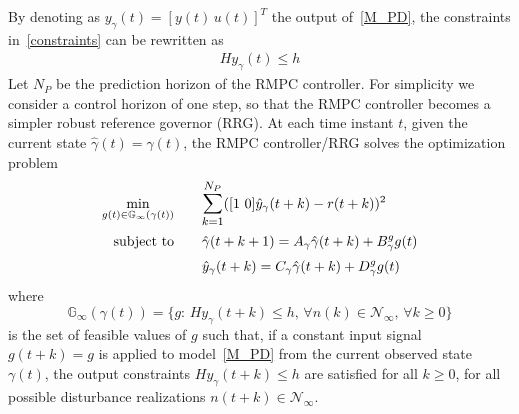 \documentclass[letterpaper, 10 pt, conference]{ieeeconf}  %
\newcommand{\AB}[1]{\textbf{\color{magenta}{[AB: #1]}}}
\newcommand{\SK}[1]{\textbf{\color{blue}{[SK: #1]}}}
\begin{document}
By denoting as $y_{\gamma}(t)=[y(t) \hspace{2pt} u(t)]^T$ the output of~\eqref{M_PD}, the constraints in~\eqref{constraints} can be rewritten as
	\begin{equation*}
	\begin{matrix}
	Hy_{\gamma}(t) \leq h
	\end{matrix}
	\end{equation*}
Let $N_P$ be the prediction horizon of the RMPC controller. For simplicity
we consider a control horizon of one step, so that the RMPC controller
becomes a simpler robust reference governor (RRG).
	At each time instant $t$, given the current state $\hat \gamma(t)=\gamma(t)$, 
the RMPC controller/RRG solves the optimization problem
	\begin{equation}
	\small
	\begin{aligned}
	 \underset{g(t)\in \mathbb{G}_{\infty}(\gamma(t))}{\text{min}}
	&  \hspace{20pt} \mathlarger{\sum\limits_{k=1}^{N_P}}([1\ 0]\hat y_\gamma(t+k)-r(t+k))^2 \\
	\text{subject to}
	& \hspace{20pt} \hat \gamma(t+k+1) = A_\gamma\hat \gamma(t+k) + B_\gamma^g g(t)\\
	& \hspace{20pt} \hat y_{\gamma}(t+k) = C_\gamma\hat \gamma(t+k) + D_\gamma^g g(t) \\
	\end{aligned}
	\label{RMPC}
	\end{equation}
	\normalsize
	where %
	\begin{equation}
	\mathbb{G}_{\infty}(\gamma(t)) = \{g: \hspace{2pt} Hy_{\gamma}(t+k) \leq h ,\hspace{2pt} \forall n(k) \in \mathcal{N}_{\infty} ,\hspace{2pt} \forall k\geq 0 \} 
	\label{O_infty}
	\end{equation}
is the set %
of feasible values of $g$ such that, if a constant input signal $g(t+k)=g$ is applied to model~\eqref{M_PD} from the current observed state $\gamma(t)$, the output constraints $Hy_{\gamma}(t+k) \leq h$ are satisfied for all $k\geq 0$, for all possible disturbance realizations $n(t+k) \in \mathcal{N}_{\infty}$.
\end{document}
